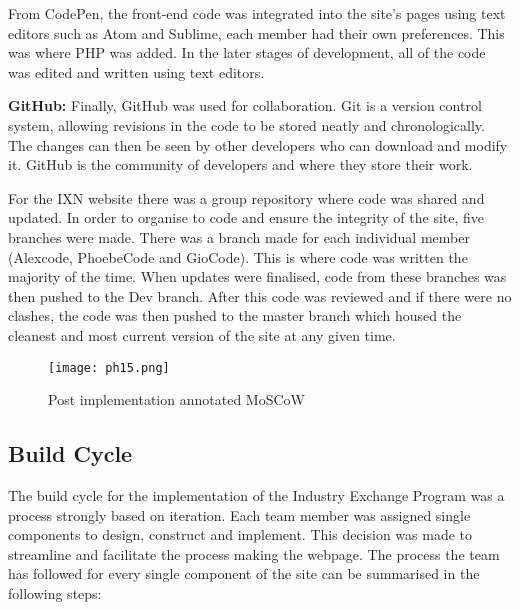 \documentclass[fontsize=11pt]{extarticle}
\numberwithin{figure}{section} %
\begin{document}
From CodePen, the front-end code was integrated into the site's pages
using text editors such as Atom and Sublime, each member had their own
preferences. This was where PHP was added. In the later stages of
development, all of the code was edited and written using text editors.

\textbf{GitHub:} Finally, GitHub was used for collaboration. Git is a
version control system, allowing revisions in the code to be stored
neatly and chronologically. The changes can then be seen by other
developers who can download and modify it. \cite{p20} GitHub is the
community of developers and where they store their work.

For the IXN website there was a group repository where code was shared
and updated. In order to organise to code and ensure the integrity of
the site, five branches were made. There was a branch made for each
individual member (Alexcode, PhoebeCode and GioCode). This is where code
was written the majority of the time. When updates were finalised, code
from these branches was then pushed to the Dev branch. After this code
was reviewed and if there were no clashes, the code was then pushed to
the master branch which housed the cleanest and most current version of
the site at any given time.

\begin{figure}[H]
      \centering
      \texttt{[image: ph15.png]}
      \caption{Post implementation annotated MoSCoW}
 \end{figure}

\hypertarget{build-cycle}{%
\subsection{Build Cycle}\label{build-cycle}}

The build cycle for the implementation of the Industry Exchange Program
was a process strongly based on iteration. Each team member was assigned
single components to design, construct and implement. This decision was
made to streamline and facilitate the process making the webpage. The
process the team has followed for every single component of the site can
be summarised in the following steps:
\end{document}
